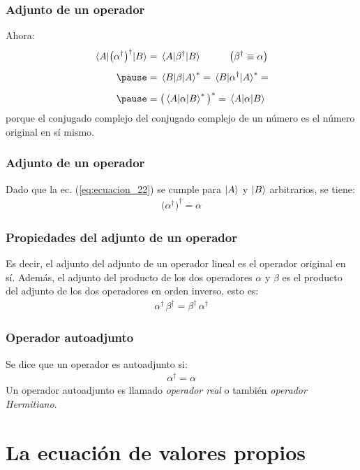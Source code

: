 \documentclass[12pt]{beamer}
\begin{document}
\begin{frame}
\frametitle{Adjunto de un operador}
Ahora:
\pause
\begin{eqnarray}
\begin{aligned}[b]
\mel{A}{\big( \alpha^{\dagger} \big)^{\dagger}}{B} &= \mel{A}{\beta^{\dagger}}{B} \hspace{1cm} \big( \beta^{\dagger} \equiv \alpha \big) \\[0.5em] \pause
&= \mel{B}{\beta}{A}^{*} = \mel{B}{\alpha^{\dagger}}{A}^{*} = \\[0.5em] \pause
&= \big( \mel{A}{\alpha}{B}^{*} \big)^{*} = \mel{A}{\alpha}{B}
\end{aligned}
\label{eq:ecuacion_22}
\end{eqnarray}
porque el conjugado complejo del conjugado complejo de un número es el número original en sí mismo.
\end{frame}
\begin{frame}
\frametitle{Adjunto de un operador}
Dado que la ec. (\ref{eq:ecuacion_22}) se cumple para $\ket{A}$ y $\ket{B}$ arbitrarios, se tiene:
\pause
\begin{align*}
\big( \alpha^{\dagger} \big)^{\dagger} = \alpha
\end{align*}
\end{frame}
\begin{frame}
\frametitle{Propiedades del adjunto de un operador}
Es decir, el adjunto del adjunto de un operador lineal es el operador original en sí. \pause Además, el adjunto del producto de los dos operadores $\alpha$ y $\beta$ es el producto del adjunto de los dos operadores en orden inverso, esto es:
\pause
\begin{align*}
\alpha^{\dagger} \, \beta^{\dagger} = \beta^{\dagger} \, \alpha^{\dagger}
\end{align*}
\end{frame}
\begin{frame}
\frametitle{Operador autoadjunto}
Se dice que un operador es autoadjunto si:
\pause
\begin{align*}
\alpha^{\dagger} = \alpha
\end{align*}
Un operador autoadjunto es llamado \emph{operador real} o también \emph{operador Hermitiano}.
\end{frame}

\section{La ecuación de valores propios}
\end{document}
